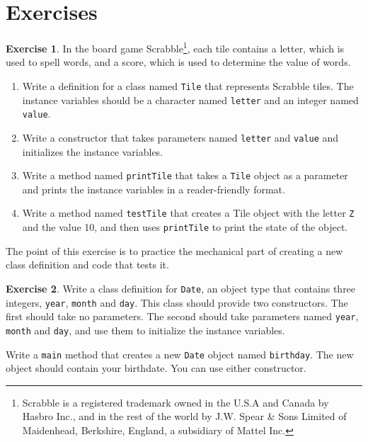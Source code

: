\documentclass[12pt]{book}
\theoremstyle{definition}
\newtheorem{excz}{Exercise}[chapter]
\newenvironment{exercise}{\bigskip\begin{excz}\mbox{}}{\end{excz}}
\begin{document}
\section{Exercises}

\begin{exercise}
In the board game Scrabble\footnote{Scrabble is a registered trademark
owned in the U.S.A and Canada by Hasbro Inc., and in the rest of the world
by J.W. Spear \& Sons Limited of Maidenhead, Berkshire, England, a subsidiary 
of Mattel Inc.}, each tile contains a letter, which is used to spell
words, and a score, which is used to determine the value of words.

\begin{enumerate}

\item Write a definition for a class named {\tt Tile}
that represents Scrabble tiles.  The instance variables should
be a character named {\tt letter} and an integer named {\tt value}.

\item Write a constructor that takes parameters named {\tt letter}
and {\tt value} and initializes the instance variables.

\item Write a method named {\tt printTile} that takes a {\tt Tile}
object as a parameter and prints the instance variables in
a reader-friendly format.

\item Write a method named {\tt testTile} that creates a
Tile object with the letter {\tt Z} and the value 10, and
then uses {\tt printTile} to print the state of the object.

\end{enumerate}

The point of this exercise is to practice the mechanical part
of creating a new class definition and code that tests it.
\end{exercise}


\begin{exercise}
Write a class definition for {\tt Date}, an object type that
contains three integers, {\tt year}, {\tt month} and {\tt day}.
This class should provide two constructors.  The first should
take no parameters.  The second should take parameters named
{\tt year}, {\tt month} and {\tt day}, and use them to initialize
the instance variables.

Write a {\tt main} method that creates a new {\tt Date} object
named {\tt birthday}.  The new object should contain your birthdate.
You can use either constructor.
\end{exercise}
\end{document}
